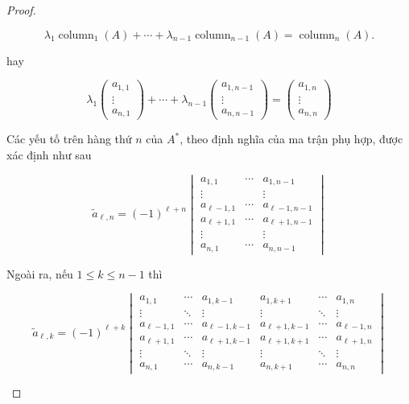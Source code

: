 \documentclass[class=nhvh-linear-algebra,crop=false]{standalone}
\begin{document}
\begin{proof}
\begin{enumerate}[label = \textbf{Trường hợp \arabic*.},itemindent=2cm]
              \[ \lambda_{1}\operatorname{column}_{1}(A) + \cdots + \lambda_{n-1}\operatorname{column}_{n-1}(A) = \operatorname{column}_{n}(A). \]

              hay

              \[\lambda_{1}\begin{pmatrix}a_{1,1}\\ \vdots \\ a_{n,1} \end{pmatrix} + \cdots + \lambda_{n-1}\begin{pmatrix}a_{1,n-1}\\ \vdots \\ a_{n,n-1} \end{pmatrix} = \begin{pmatrix}a_{1,n}\\ \vdots \\ a_{n,n} \end{pmatrix}\]

              Các yếu tố trên hàng thứ $n$ của $A^{*}$, theo định nghĩa của ma trận phụ hợp, được xác định như sau

              \[\tilde{a}_{\ell, n} = {(-1)}^{\ell + n} \begin{vmatrix} a_{1,1}      & \cdots & a_{1,n-1}      \\ \vdots &  & \vdots \\ a_{\ell-1,1} & \cdots & a_{\ell-1,n-1} \\
                a_{\ell+1,1} & \cdots & a_{\ell+1,n-1} \\ \vdots & & \vdots \\ a_{n,1} & \cdots & a_{n,n-1}\end{vmatrix}\]

              Ngoài ra, nếu $1\leq k\leq n-1$ thì

              \[\tilde{a}_{\ell, k} = {(-1)}^{\ell + k} \begin{vmatrix} a_{1,1} & \cdots & a_{1,k-1} & a_{1,k+1} & \cdots & a_{1,n} \\ \vdots & \ddots & \vdots & \vdots & \ddots & \vdots \\ a_{\ell - 1,1} & \cdots & a_{\ell-1,k-1} & a_{\ell+1,k-1} & \cdots & a_{\ell-1,n} \\ a_{\ell+1,1} & \cdots & a_{\ell+1,k-1} & a_{\ell+1,k+1} & \cdots & a_{\ell+1,n} \\ \vdots & \ddots & \vdots & \vdots & \ddots & \vdots \\ a_{n,1} & \cdots & a_{n,k-1} & a_{n,k+1} & \cdots & a_{n,n} \end{vmatrix}\]


\end{enumerate}
\end{proof}
\end{document}
